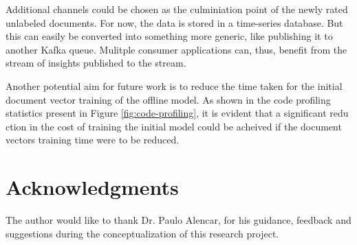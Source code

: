 \documentclass[conference]{IEEEtran}
\begin{document}
    Additional channels could be chosen as the culminiation point of the newly rated unlabeled documents.
    For now, the data is stored in a time-series database.
    But this can easily be converted into something more generic, like publishing it to another Kafka queue.
    Mulitple consumer applications can, thus, benefit from the stream of insights published to the stream.

    Another potential aim for future work is to reduce the time taken for the initial document vector training of the offline model.
    As shown in the code profiling statistics present in Figure \ref{fig:code-profiling}, it is evident that a significant redu
    ction in the cost of training the initial model could be acheived if the document vectors training time were to be reduced.

\vspace{5mm}

\section{Acknowledgments}
    The author would like to thank Dr. Paulo Alencar, for his guidance, feedback and suggestions during the conceptualization of this research project.

\vspace{5mm}



\end{document}

